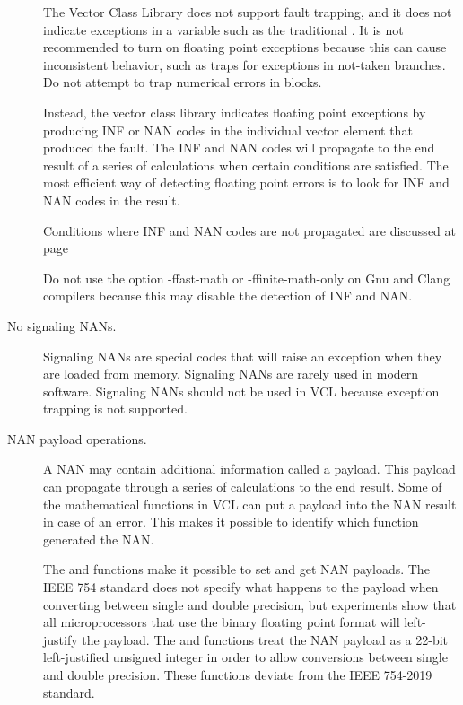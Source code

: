 \documentclass[vcl_manual.tex]{subfiles}
\begin{document}
\begin{description}
The Vector Class Library does not support fault trapping, and it does not indicate exceptions in a variable such as the traditional . It is not recommended to turn on floating point exceptions because this can cause inconsistent behavior, such as traps for exceptions in not-taken branches. Do not attempt to trap numerical errors in  blocks.

Instead, the vector class library indicates floating point exceptions by producing INF or NAN codes in the individual vector element that produced the fault.
The INF and NAN codes will propagate to the end result of a series of calculations when certain conditions are satisfied. The most efficient way of detecting floating point errors is to look for INF and NAN codes in the result.

Conditions where INF and NAN codes are not propagated are discussed at page  \pageref{FloatingPointErrors}

Do not use the option -ffast-math or -ffinite-math-only on Gnu and Clang compilers because this may disable the detection of INF and NAN.

\item[No signaling NANs.]
Signaling NANs are special codes that will raise an exception when they are loaded from memory. Signaling NANs are rarely used in modern software. Signaling NANs should not be used in VCL because exception trapping is not supported.

\item[NAN payload operations.]
A NAN may contain additional information called a payload. This payload can propagate through a series of calculations to the end result. Some of the mathematical functions in VCL can put a payload into the NAN result in case of an error. This makes it possible to identify which function generated the NAN.

The  and  functions make it possible to set and get NAN payloads. The IEEE 754 standard does not specify what happens to the payload when converting between single and double precision, but experiments show that all microprocessors that use the binary floating point format will left-justify the payload. The  and  functions treat the NAN payload as a 22-bit left-justified unsigned integer in order to allow conversions between single and double precision. These functions deviate from the IEEE 754-2019 standard.


\end{description}
\end{document}
